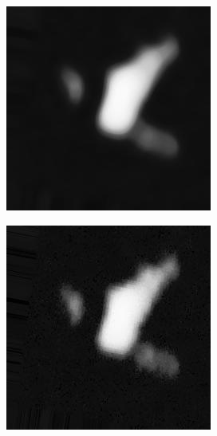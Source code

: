 \begin{figure}[h!]
	\centering
	\begin{minipage}{.5\textwidth}
		\centering
		\includegraphics[width=0.8\linewidth]{inc/img/nc_m_d10}
		\label{fig:nc_m_d10}
	\end{minipage}%
	\begin{minipage}{.5\textwidth}
		\centering
		\includegraphics[width=0.8\linewidth]{inc/img/nc_b_d10}
		\label{fig:nc_b_d10}
	\end{minipage}
\end{figure}

